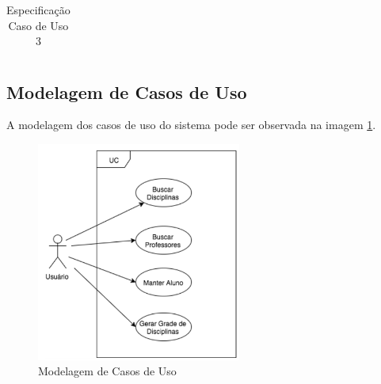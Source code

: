 \begin{table}[H]
\begin{tabular}{|c|l|}
	\end{tabular}
	\caption{Especificação Caso de Uso 3}
	\label{tab:UC3}
\end{table}

\subsection{Modelagem de Casos de Uso} %
\label{sub:modelagem_de_casos_de_uso}

A modelagem dos casos de uso do sistema pode ser observada na imagem \ref{img:modelagemUC}.
\begin{figure}[H]
	\centering
	\includegraphics[width=0.6\textwidth]{imagens/modelagemUC}
	\caption{Modelagem de Casos de Uso}
	\label{img:modelagemUC}
\end{figure}


